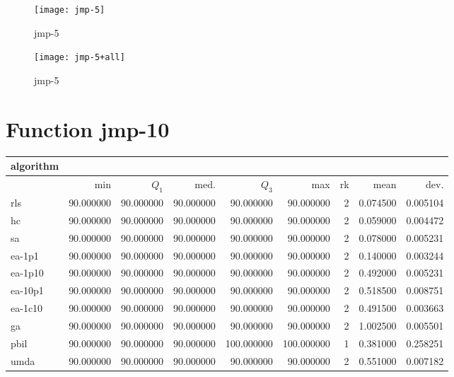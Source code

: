 \begin{center}
\begin{figure}[h]
\centering
\texttt{[image: jmp-5]}
\caption{jmp-5}
\end{figure}
\end{center}

\begin{center}
\begin{figure}[h]
\centering
\texttt{[image: jmp-5+all]}
\caption{jmp-5}
\end{figure}
\end{center}

\newpage

\section{Function jmp-10}
\begin{center}
\begin{tabular}{@{}l*{5}{>{{}}N{3}{0}}>{{}}N{2}{0}N{1}{3}N{1}{3}@{}}
\toprule
{algorithm} &  &  \\
\midrule
& {min} & {$Q_1$} & {med.} & {$Q_3$} & {max} & {rk} & {mean} & {dev.} \\
\midrule
rls & {\color{blue}} 90.000000 & {\color{blue}} 90.000000 & {\color{blue}} 90.000000 & 90.000000 & 90.000000 & 2 & 0.074500 & 0.005104 \\
 hc & {\color{blue}} 90.000000 & {\color{blue}} 90.000000 & {\color{blue}} 90.000000 & 90.000000 & 90.000000 & 2 & 0.059000 & 0.004472 \\
 sa & {\color{blue}} 90.000000 & {\color{blue}} 90.000000 & {\color{blue}} 90.000000 & 90.000000 & 90.000000 & 2 & 0.078000 & 0.005231 \\
 ea-1p1 & {\color{blue}} 90.000000 & {\color{blue}} 90.000000 & {\color{blue}} 90.000000 & 90.000000 & 90.000000 & 2 & 0.140000 & 0.003244 \\
 ea-1p10 & {\color{blue}} 90.000000 & {\color{blue}} 90.000000 & {\color{blue}} 90.000000 & 90.000000 & 90.000000 & 2 & 0.492000 & 0.005231 \\
 ea-10p1 & {\color{blue}} 90.000000 & {\color{blue}} 90.000000 & {\color{blue}} 90.000000 & 90.000000 & 90.000000 & 2 & 0.518500 & 0.008751 \\
 ea-1c10 & {\color{blue}} 90.000000 & {\color{blue}} 90.000000 & {\color{blue}} 90.000000 & 90.000000 & 90.000000 & 2 & 0.491500 & 0.003663 \\
 ga & {\color{blue}} 90.000000 & {\color{blue}} 90.000000 & {\color{blue}} 90.000000 & 90.000000 & 90.000000 & 2 & 1.002500 & 0.005501 \\
 pbil & {\color{blue}} 90.000000 & {\color{blue}} 90.000000 & {\color{blue}} 90.000000 & {\color{blue}} 100.000000 & {\color{blue}} 100.000000 & 1 & 0.381000 & 0.258251 \\
 umda & {\color{blue}} 90.000000 & {\color{blue}} 90.000000 & {\color{blue}} 90.000000 & 90.000000 & 90.000000 & 2 & 0.551000 & 0.007182 \\
 \bottomrule
\end{tabular}
\end{center}

